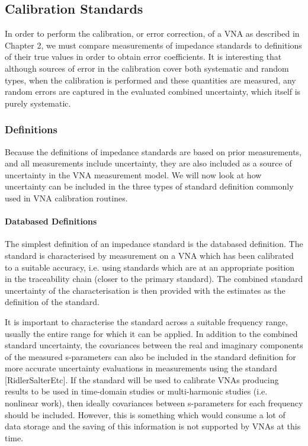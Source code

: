 \documentclass[../thesis/thesis.tex]{subfiles}
\begin{document}
\subsection{Calibration Standards}

In order to perform the calibration, or error correction, of a VNA as described in Chapter 2, we must compare measurements of impedance standards to definitions of their true values in order to obtain error coefficients. It is interesting that although sources of error in the calibration cover both systematic and random types, when the calibration is performed and these quantities are measured, any random errors are captured in the evaluated combined uncertainty, which itself is purely systematic.

\subsubsection{Definitions}

Because the definitions of impedance standards are based on prior measurements, and all measurements include uncertainty, they are also included as a source of uncertainty in the VNA measurement model. We will now look at how uncertainty can be included in the three types of standard definition commonly used in VNA calibration routines.

\paragraph{Databased Definitions}

The simplest definition of an impedance standard is the databased definition. The standard is characterised by measurement on a VNA which has been calibrated to a suitable accuracy, i.e. using standards which are at an appropriate position in the traceability chain (closer to the primary standard). The combined standard uncertainty of the characterisation is then provided with the estimates as the definition of the standard.

It is important to characterise the standard across a suitable frequency range, usually the entire range for which it can be applied. In addition to the combined standard uncertainty, the covariances between the real and imaginary components of the measured s-parameters can also be included in the standard definition for more accurate uncertainty evaluations in measurements using the standard [RidlerSalterEtc]. If the standard will be used to calibrate VNAs producing results to be used in time-domain studies or multi-harmonic studies (i.e. nonlinear work), then ideally covariances between s-parameters for each frequency should be included. However, this is something which would consume a lot of data storage and the saving of this information is not supported by VNAs at this time.
\end{document}
